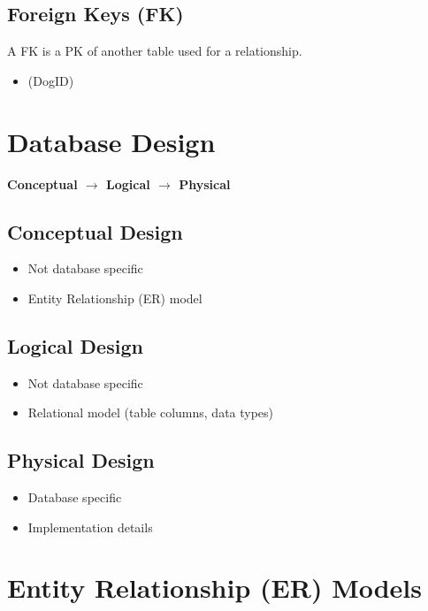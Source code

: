 \documentclass[11pt, a4paper]{article}
\begin{document}
    \subsection{Foreign Keys (FK)}
    A FK is a PK of another table used for a relationship. 
    \begin{itemize}
        \item (DogID)
    \end{itemize}
    


    \section{Database Design}
    \textbf{Conceptual $\rightarrow$ Logical $\rightarrow$ Physical} 

    \subsection{Conceptual Design}
    \begin{itemize}
        \item Not database specific 
        \item Entity Relationship (ER) model 
    \end{itemize}

    \subsection{Logical Design}
    \begin{itemize}
        \item Not database specific 
        \item Relational model (table columns, data types) 
    \end{itemize}

    \subsection{Physical Design}
    \begin{itemize}
        \item Database specific 
        \item Implementation details 
    \end{itemize}



    \section{Entity Relationship (ER) Models}
\end{document}
